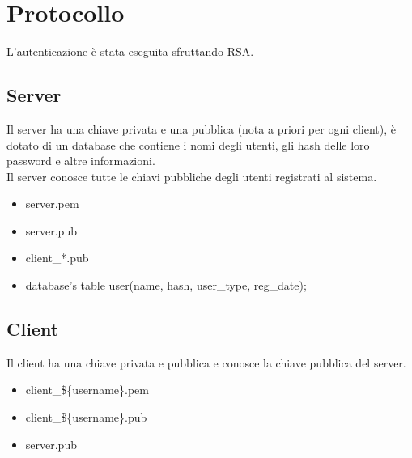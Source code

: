 \documentclass[a4paper,titlepage]{article}
\begin{document}
\section{Protocollo}
L'autenticazione è stata eseguita sfruttando RSA.
\subsection{Server}
Il server ha una chiave privata e una pubblica (nota a priori per ogni client), è dotato di un database che contiene i nomi degli utenti, gli hash delle loro password e altre informazioni.\\
Il server conosce tutte le chiavi pubbliche degli utenti registrati al sistema.
\begin{itemize}
\item server.pem
\item server.pub
\item client\_*.pub
\item database's table user(name, hash, user\_type, reg\_date);
\end{itemize}

\subsection{Client}
Il client ha una chiave privata e pubblica e conosce la chiave pubblica del server.
\begin{itemize}
\item client\_\$\{username\}.pem
\item client\_\$\{username\}.pub
\item server.pub
\end{itemize}
\end{document}
